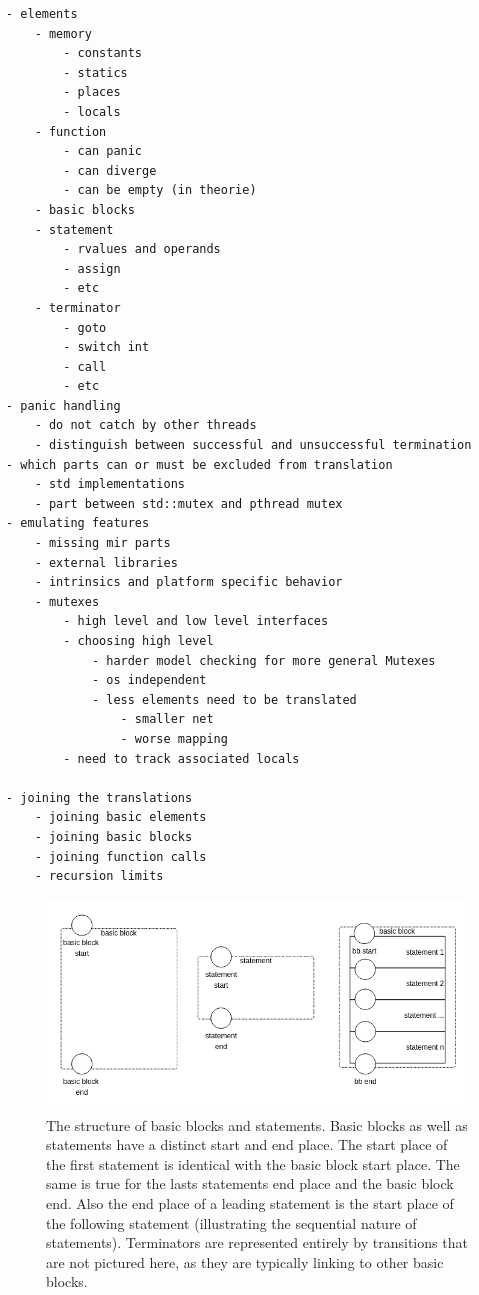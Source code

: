 \begin{verbatim}
- elements
    - memory
        - constants
        - statics
        - places
        - locals
    - function
        - can panic
        - can diverge
        - can be empty (in theorie)
    - basic blocks
    - statement
        - rvalues and operands
        - assign
        - etc
    - terminator
        - goto
        - switch int
        - call
        - etc
- panic handling
    - do not catch by other threads
    - distinguish between successful and unsuccessful termination
- which parts can or must be excluded from translation
    - std implementations
    - part between std::mutex and pthread mutex
- emulating features
    - missing mir parts
    - external libraries
    - intrinsics and platform specific behavior
    - mutexes
        - high level and low level interfaces
        - choosing high level
            - harder model checking for more general Mutexes
            - os independent
            - less elements need to be translated
                - smaller net
                - worse mapping
        - need to track associated locals

- joining the translations
    - joining basic elements
    - joining basic blocks
    - joining function calls
    - recursion limits
\end{verbatim}
\begin{figure}
    \centering
    \includegraphics[width=.9\textwidth]{../diagrams/basic_blocks.png}
    \caption{
        The structure of basic blocks and statements.
        Basic blocks as well as statements have a distinct start and end place.
        The start place of the first statement is identical with the basic block start place.
        The same is true for the lasts statements end place and the basic block end.
        Also the end place of a leading statement is the start place of the following statement (illustrating the sequential nature of statements).
        Terminators are represented entirely by transitions that are not pictured here, as they are typically linking to other basic blocks.
    }
    \label{basic_block_trans}
\end{figure}

